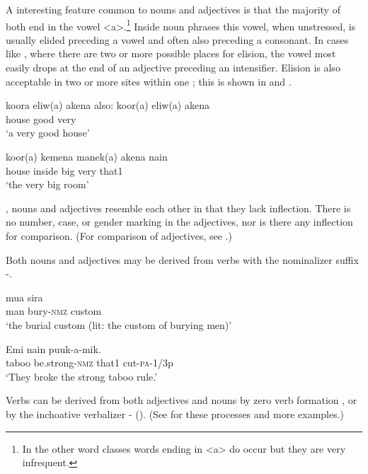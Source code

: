 A  interesting feature common to nouns and adjectives is that the majority of both end in the vowel <a>.\footnote{In the other word classes words ending in <a> do occur but they are very infrequent.} Inside noun phrases this vowel, when unstressed, is usually elided preceding a vowel and often also preceding a consonant. In cases like , where there are two or more possible places for elision, the vowel most easily drops at the end of an adjective preceding an intensifier. Elision is also acceptable in two or more sites within one ; this is shown in   and . 

\ea%
\label{ex:3:x3}
\gll koora eliw(a) akena  {\upshape also:} koor(a) eliw(a) akena \\
house good very\\
\glt`a very good house'
\z

\ea%
\label{ex:3:x4}
\gll koor(a) kemena manek(a) akena nain \\
house inside big very that1\\
\glt`the very big room'
\z

, nouns and adjectives resemble each other in that they lack inflection. There is no number, case, or gender marking in the adjectives, nor is there any inflection for comparison. (For comparison of adjectives, see .) 

Both nouns  and adjectives  may be derived from verbs with the nominalizer suffix \nobreakdash-.

\ea%
\label{ex:3:x7}
\gll mua  sira \\
man bury-\textsc{nmz} custom\\
\glt`the burial custom (lit: the custom of burying men)'
\z

\ea%
\label{ex:3:x8}
\gll Emi  nain puuk-a-mik. \\
taboo be.strong-\textsc{nmz} that1 cut-\textsc{pa}-1/3p\\
\glt`They broke the strong taboo rule.'
\z

Verbs can be derived from both adjectives and nouns by zero verb formation ,  or by the inchoative verbalizer \nobreakdash- (). (See  for these processes and more examples.)

